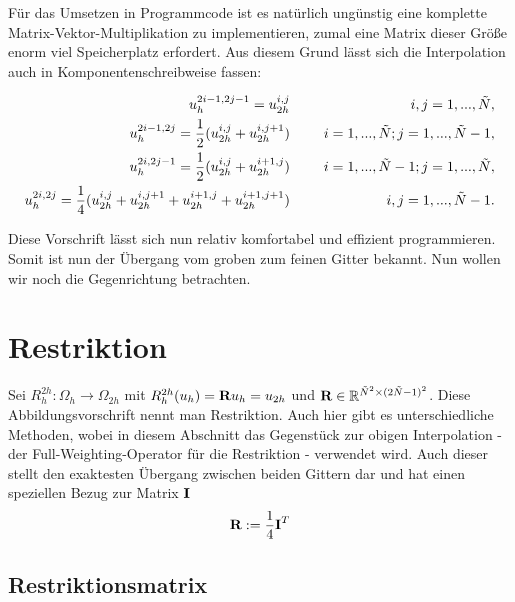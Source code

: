 Für das Umsetzen in Programmcode ist es natürlich ungünstig eine komplette Matrix-Vektor-Multiplikation zu implementieren, zumal eine Matrix dieser Größe enorm viel Speicherplatz erfordert. Aus diesem Grund lässt sich die Interpolation auch in Komponentenschreibweise fassen:

\begin{eqnarray}
u_{h}^{2i-1,2j-1} = u_{2h}^{i,j} &\hspace{0.5cm}& i,j = 1,...,\tilde N, \\
u_{h}^{2i-1,2j} = \frac{1}{2} (u_{2h}^{i,j} + u_{2h}^{i,j+1}) &\hspace{0.5cm}& i = 1,...,\tilde N; j = 1,...,\tilde N - 1, \\
u_{h}^{2i,2j-1} = \frac{1}{2} (u_{2h}^{i,j} + u_{2h}^{i+1,j}) &\hspace{0.5cm}& i = 1,...,\tilde N - 1; j = 1,...,\tilde N, \\
u_{h}^{2i,2j} = \frac{1}{4} (u_{2h}^{i,j} + u_{2h}^{i,j+1} + u_{2h}^{i+1,j} + u_{2h}^{i+1,j+1}) &\hspace{0.5cm}& i,j = 1,...,\tilde N - 1.
\end{eqnarray}

Diese Vorschrift lässt sich nun relativ komfortabel und effizient programmieren. Somit ist nun der Übergang vom groben zum feinen Gitter bekannt. Nun wollen wir noch die Gegenrichtung betrachten.

\section{Restriktion}

Sei $R_{h}^{2h}: \Omega_{h} \longrightarrow \Omega_{2h}$ mit $R_{h}^{2h}(u_{h}) = {\textbf{R}}u_{h} = u_{2h}$ und ${\textbf{R}} \in \mathbb{R}^{\tilde N^{2} \times (2 \tilde N - 1)^{2}}$. Diese Abbildungsvorschrift nennt man Restriktion. Auch hier gibt es unterschiedliche Methoden, wobei in diesem Abschnitt das Gegenstück zur obigen Interpolation - der Full-Weighting-Operator für die Restriktion - verwendet wird. Auch dieser stellt den exaktesten Übergang zwischen beiden Gittern dar und hat einen speziellen Bezug zur Matrix ${\textbf{I}}$
\begin{equation}
{\textbf{R}} := \frac {1} {4} {\textbf{I}}^{T}
\end{equation}

\subsection{Restriktionsmatrix}

